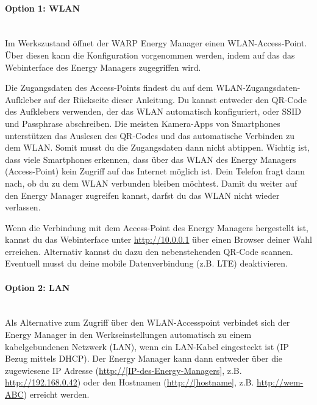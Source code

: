 \documentclass[a4paper,10pt]{article}
\begin{document}
\begin{multicols*}{2}
	\paragraph{Option 1: WLAN}\ \\

	Im Werkszustand öffnet der WARP Energy Manager einen WLAN-Access-Point. Über diesen kann
	die Konfiguration vorgenommen werden, indem auf das das Webinterface des
	Energy Managers zugegriffen wird.

	Die Zugangsdaten des Access-Points findest du auf dem WLAN-Zugangsdaten-Aufkleber
	auf der Rückseite dieser Anleitung. Du kannst entweder den QR-Code des Aufklebers verwenden,
	der das WLAN automatisch konfiguriert, oder SSID und Passphrase abschreiben.
	Die meisten Kamera-Apps von Smartphones unterstützen das Auslesen des
	QR-Codes und das automatische Verbinden zu dem WLAN. Somit musst du die
	Zugangsdaten dann nicht abtippen. Wichtig ist, dass viele Smartphones
	erkennen, dass über das WLAN des Energy Managers (Access-Point) kein Zugriff auf das
	Internet möglich ist. Dein Telefon fragt dann nach, ob du zu dem WLAN
	verbunden bleiben möchtest. Damit du weiter auf den Energy Manager zugreifen
	kannst, darfst du das WLAN nicht wieder verlassen.

	\begin{minipage}{0.35\textwidth}
		Wenn die Verbindung mit dem Access-Point des Energy Managers hergestellt ist, kannst du das Webinterface
		unter \url{http://10.0.0.1} über einen Browser deiner Wahl erreichen.
		Alternativ kannst du dazu den nebenstehenden QR-Code scannen.
		Eventuell musst du deine mobile Datenverbindung (z.B. LTE) deaktivieren.
	\end{minipage}\hfill
	\begin{minipage}{0.12\textwidth}
		\begin{flushright}
		\end{flushright}
	\end{minipage}

	\paragraph{Option 2: LAN}\ \\
	Als Alternative zum Zugriff über den WLAN-Accesspoint verbindet sich der
	Energy Manager in den Werkseinstellungen automatisch zu einem
	kabelgebundenen Netzwerk (LAN), wenn ein LAN-Kabel eingesteckt ist (IP Bezug
	mittels DHCP). Der Energy Manager kann dann entweder über die zugewiesene IP
	Adresse (\url{http://[IP-des-Energy-Managers]}, z.B. \url{http://192.168.0.42})
	oder den Hostnamen (\url{http://[hostname]}, z.B. \url{http://wem-ABC}) erreicht werden.


\end{multicols*}
\end{document}
